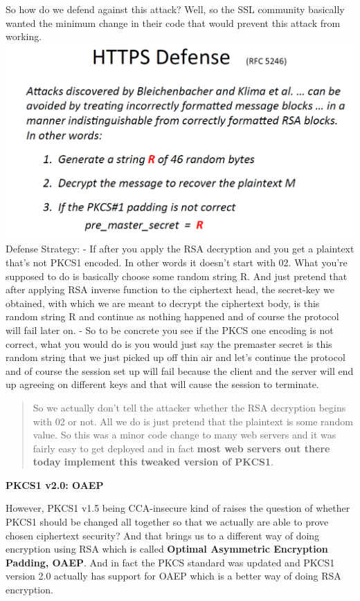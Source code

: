 \documentclass[11pt]{article}
\makeatletter
\def\maxwidth{\ifdim\Gin@nat@width>\linewidth\linewidth
    \else\Gin@nat@width\fi}
\let\Oldincludegraphics\includegraphics
\renewcommand{\includegraphics}[1]{\Oldincludegraphics[width=.8\maxwidth]{#1}}
\makeatother
\begin{document}
So how do we defend against this attack? Well, so the SSL community
basically wanted the minimum change in their code that would prevent
this attack from working. \includegraphics{./Images/DefendPKCS1.png}
Defense Strategy: - If after you apply the RSA decryption and you get a
plaintext that's not PKCS1 encoded. In other words it doesn't start with
02. What you're supposed to do is basically choose some random string R.
And just pretend that after applying RSA inverse function to the
ciphertext head, the secret-key we obtained, with which we are meant to
decrypt the ciphertext body, is this random string R and continue as
nothing happened and of course the protocol will fail later on. - So to
be concrete you see if the PKCS one encoding is not correct, what you
would do is you would just say the premaster secret is this random
string that we just picked up off thin air and let's continue the
protocol and of course the session set up will fail because the client
and the server will end up agreeing on different keys and that will
cause the session to terminate.

\begin{quote}
So we actually don't tell the attacker whether the RSA decryption begins
with 02 or not. All we do is just pretend that the plaintext is some
random value. So this was a minor code change to many web servers and it
was fairly easy to get deployed and in fact \textbf{most web servers out
there today implement this tweaked version of PKCS1}.
\end{quote}

\textbf{PKCS1 v2.0: OAEP}

However, PKCS1 v1.5 being CCA-insecure kind of raises the question of
whether PKCS1 should be changed all together so that we actually are
able to prove chosen ciphertext security? And that brings us to a
different way of doing encryption using RSA which is called
\textbf{Optimal Asymmetric Encryption Padding, OAEP}. And in fact the
PKCS standard was updated and PKCS1 version 2.0 actually has support for
OAEP which is a better way of doing RSA encryption.
\end{document}
